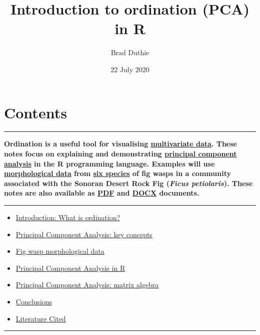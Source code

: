 \documentclass[]{article}
\title{Introduction to ordination (PCA) in R}
\author{Brad Duthie}
\date{22 July 2020}
\providecommand{\tightlist}{%
  \setlength{\itemsep}{0pt}\setlength{\parskip}{0pt}}
\begin{document}
\maketitle

\hypertarget{contents}{%
\section{Contents}\label{contents}}

\begin{center}\rule{0.5\linewidth}{0.5pt}\end{center}

\textbf{Ordination is a useful tool for visualising
\href{https://en.wikipedia.org/wiki/Multivariate_analysis}{multivariate
data}. These notes focus on explaining and demonstrating
\href{https://en.wikipedia.org/wiki/Principal_component_analysis}{principal
component analysis} in the R programming language. Examples will use
\href{https://github.com/StirlingCodingClub/ordination/master/wing_loadings.csv}{morphological
data} from
\href{http://bradduthie.github.io/DuthieEtAl2015_Appendix.pdf\#page=3}{six
species} of fig wasps in a community associated with the Sonoran Desert
Rock Fig (\emph{Ficus petiolaris}). These notes are also available as
\href{https://stirlingcodingclub.github.io/ordination/index.pdf}{PDF}
and
\href{https://stirlingcodingclub.github.io/ordination/index.docx}{DOCX}
documents.}

\begin{center}\rule{0.5\linewidth}{0.5pt}\end{center}

\begin{itemize}
\tightlist
\item
  \protect\hyperlink{intro}{Introduction: What is ordination?}
\item
  \protect\hyperlink{pca}{Principal Component Analysis: key concepts}
\item
  \protect\hyperlink{wasps}{Fig wasp morphological data}
\item
  \protect\hyperlink{Rcode}{Principal Component Analysis in R}
\item
  \protect\hyperlink{maths}{Principal Component Analysis: matrix
  algebra}
\item
  \protect\hyperlink{conclusions}{Conclusions}
\item
  \protect\hyperlink{refs}{Literature Cited}
\end{itemize}

\begin{center}\rule{0.5\linewidth}{0.5pt}\end{center}
\end{document}
